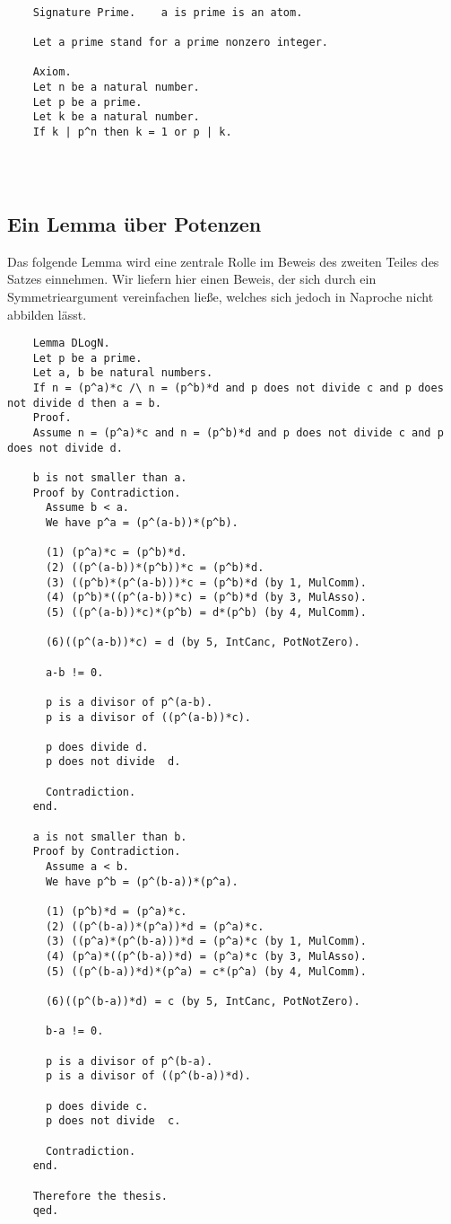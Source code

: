 \documentclass[a4paper,12pt]{scrartcl}
\begin{document}
\begin{lstlisting}

	Signature Prime.    a is prime is an atom.
	
	Let a prime stand for a prime nonzero integer.
	
	Axiom.
	Let n be a natural number.
	Let p be a prime.
	Let k be a natural number.
	If k | p^n then k = 1 or p | k.
	

	

\end{lstlisting}

\subsection{Ein Lemma über Potenzen}

Das folgende Lemma wird eine zentrale Rolle im Beweis des zweiten Teiles des Satzes einnehmen.
Wir liefern hier einen Beweis, der sich durch ein Symmetrieargument vereinfachen ließe, welches sich jedoch in Naproche nicht abbilden lässt.

\begin{lstlisting}
	Lemma DLogN.
	Let p be a prime.
	Let a, b be natural numbers.
	If n = (p^a)*c /\ n = (p^b)*d and p does not divide c and p does not divide d then a = b.
	Proof.
	Assume n = (p^a)*c and n = (p^b)*d and p does not divide c and p does not divide d.
	
	b is not smaller than a.
	Proof by Contradiction.
	  Assume b < a.
	  We have p^a = (p^(a-b))*(p^b).
	
	  (1) (p^a)*c = (p^b)*d.
	  (2) ((p^(a-b))*(p^b))*c = (p^b)*d.
	  (3) ((p^b)*(p^(a-b)))*c = (p^b)*d (by 1, MulComm).
	  (4) (p^b)*((p^(a-b))*c) = (p^b)*d (by 3, MulAsso).
	  (5) ((p^(a-b))*c)*(p^b) = d*(p^b) (by 4, MulComm).
	  
	  (6)((p^(a-b))*c) = d (by 5, IntCanc, PotNotZero).
	  
	  a-b != 0.
	
	  p is a divisor of p^(a-b).
	  p is a divisor of ((p^(a-b))*c).
	
	  p does divide d.
	  p does not divide  d.
	
	  Contradiction.
	end.
	
	a is not smaller than b.
	Proof by Contradiction.
	  Assume a < b.
	  We have p^b = (p^(b-a))*(p^a).
	
	  (1) (p^b)*d = (p^a)*c.
	  (2) ((p^(b-a))*(p^a))*d = (p^a)*c.
	  (3) ((p^a)*(p^(b-a)))*d = (p^a)*c (by 1, MulComm).
	  (4) (p^a)*((p^(b-a))*d) = (p^a)*c (by 3, MulAsso).
	  (5) ((p^(b-a))*d)*(p^a) = c*(p^a) (by 4, MulComm).
	  
	  (6)((p^(b-a))*d) = c (by 5, IntCanc, PotNotZero).
	  
	  b-a != 0.
	
	  p is a divisor of p^(b-a).
	  p is a divisor of ((p^(b-a))*d).
	
	  p does divide c.
	  p does not divide  c.
	
	  Contradiction.
	end.
	
	Therefore the thesis.
	qed.
\end{lstlisting}
\end{document}
